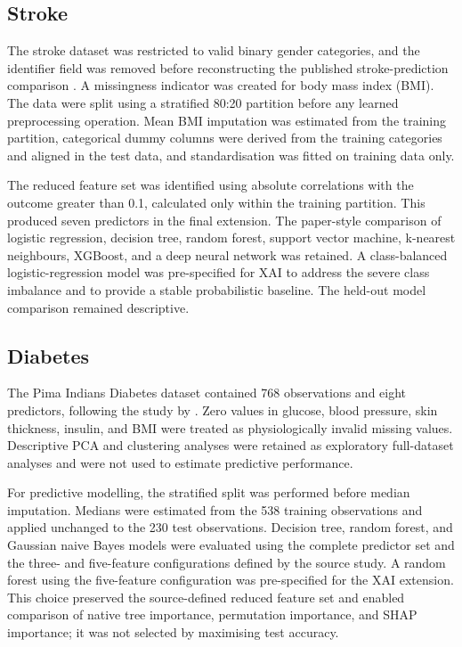 \subsection{Stroke}

The stroke dataset was restricted to valid binary gender categories, and the identifier field was removed before reconstructing the published stroke-prediction comparison \citep{wu_stroke_2024}. A missingness indicator was created for body mass index (BMI). The data were split using a stratified 80:20 partition before any learned preprocessing operation. Mean BMI imputation was estimated from the training partition, categorical dummy columns were derived from the training categories and aligned in the test data, and standardisation was fitted on training data only.

The reduced feature set was identified using absolute correlations with the outcome greater than 0.1, calculated only within the training partition. This produced seven predictors in the final extension. The paper-style comparison of logistic regression, decision tree, random forest, support vector machine, k-nearest neighbours, XGBoost, and a deep neural network was retained. A class-balanced logistic-regression model was pre-specified for XAI to address the severe class imbalance and to provide a stable probabilistic baseline. The held-out model comparison remained descriptive.

\subsection{Diabetes}

The Pima Indians Diabetes dataset contained 768 observations and eight predictors, following the study by \citet{chang_pima_2022}. Zero values in glucose, blood pressure, skin thickness, insulin, and BMI were treated as physiologically invalid missing values. Descriptive PCA and clustering analyses were retained as exploratory full-dataset analyses and were not used to estimate predictive performance.

For predictive modelling, the stratified split was performed before median imputation. Medians were estimated from the 538 training observations and applied unchanged to the 230 test observations. Decision tree, random forest, and Gaussian naive Bayes models were evaluated using the complete predictor set and the three- and five-feature configurations defined by the source study. A random forest using the five-feature configuration was pre-specified for the XAI extension. This choice preserved the source-defined reduced feature set and enabled comparison of native tree importance, permutation importance, and SHAP importance; it was not selected by maximising test accuracy.

